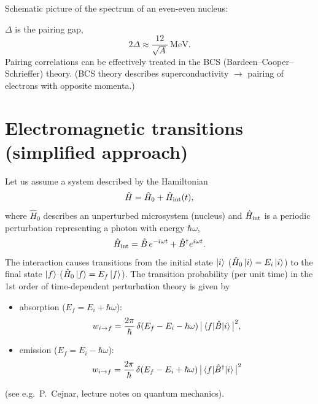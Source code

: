 \documentclass[11pt,a4paper]{article}
\newcommand{\op}[1]{\hat{#1}}
\begin{document}
Schematic picture of the spectrum of an even-even nucleus:
\begin{center}
\end{center}
$\Delta$ is the pairing gap,
\[
2\Delta\approx\frac{12}{\sqrt A}\ \text{MeV}.
\]
Pairing correlations can be effectively treated in the BCS (Bardeen--Cooper--Schrieffer) theory. (BCS theory describes superconductivity $\to$ pairing of electrons with opposite momenta.)

\section{Electromagnetic transitions (simplified approach)}
Let us assume a system described by the Hamiltonian
\[
\op H=\op H_0+\op H_{\rm int}(t),
\]
where $\op H_0$ describes an unperturbed microsystem (nucleus) and $\op H_{\rm int}$ is a periodic perturbation representing a photon with energy $\hbar\omega$,
\[
\op H_{\rm int}=\op B\,e^{-i\omega t}+\op B^\dagger e^{i\omega t}.
\]
The interaction causes transitions from the initial state $\ket i$ ($\op H_0\ket i=E_i\ket i$) to the final state $\ket f$ ($\op H_0\ket f=E_f\ket f$). The transition probability (per unit time) in the 1st order of time-dependent perturbation theory is given by
\begin{itemize}
\item absorption ($E_f=E_i+\hbar\omega$):
\[
w_{i\to f}=\frac{2\pi}{\hbar}\,\delta(E_f-E_i-\hbar\omega)\,\big|\braket{f|\op B|i}\big|^2 ,
\]
\item emission ($E_f=E_i-\hbar\omega$):
\[
w_{i\to f}=\frac{2\pi}{\hbar}\,\delta(E_f-E_i+\hbar\omega)\,\big|\braket{f|\op B^\dagger|i}\big|^2
\]
\end{itemize}
(see e.g.\ P.~Cejnar, lecture notes on quantum mechanics).
\end{document}

